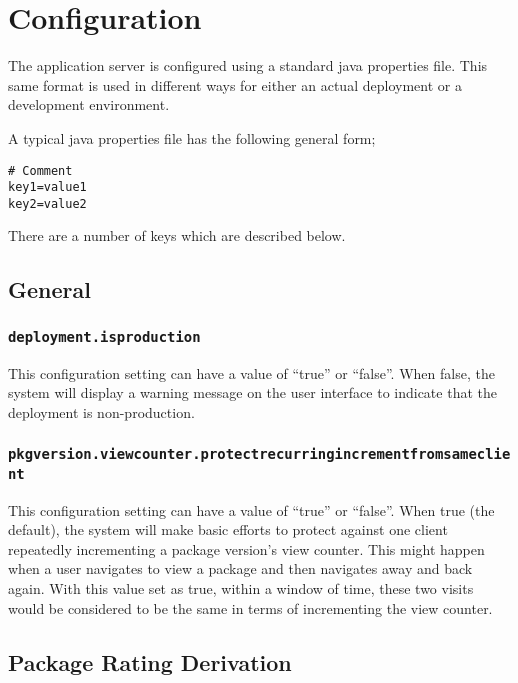 
\section{Configuration}
\label{config}

The application server is configured using a standard java properties file.  This same format is used in different ways for either an actual deployment or a development environment.

A typical java properties file has the following general form;

\begin{verbatim}
# Comment
key1=value1
key2=value2
\end{verbatim}

There are a number of keys which are described below.

\subsection{General}

\subsubsection{\tt deployment.isproduction}

This configuration setting can have a value of ``true'' or ``false''.  When false, the system will display a warning message on the user interface to indicate that the deployment is non-production.

\subsubsection{\tt pkgversion.viewcounter.protectrecurringincrementfromsameclient}

This configuration setting can have a value of ``true'' or ``false''.  When true (the default), the system will make basic efforts to protect against one client repeatedly incrementing a package version's view counter.  This might happen when a user navigates to view a package and then navigates away and back again.  With this value set as true, within a window of time, these two visits would be considered to be the same in terms of incrementing the view counter.

\subsection{Package Rating Derivation}

